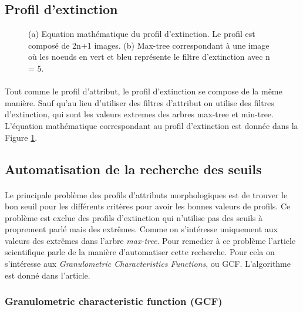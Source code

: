 \documentclass[paper=a4, 11pt]{article}
\begin{document}
\subsection{Profil d'extinction}

\begin{figure}[h]
\centering
{}
\qquad
{}
\caption{(a) Equation mathématique du profil d'extinction. Le profil est composé de 2n+1 images. (b) Max-tree correspondant à une image où les noeuds en vert et bleu représente le filtre d'extinction avec n = 5.}
\label{fig:ep}
\end{figure}


\paragraph{} Tout comme le profil d'attribut, le profil d'extinction se compose de la même manière. Sauf qu'au lieu d'utiliser des filtres d'attribut on utilise des filtres d'extinction, qui sont les valeurs extremes des arbres max-tree et min-tree. L'équation mathématique correspondant au profil d'extinction est donnée dans la Figure \ref{fig:ep}.

\subsection{Automatisation de la recherche des seuils}
\paragraph{} Le principale problème des profils d'attributs morphologiques est de trouver le bon seuil pour les différents critères pour avoir les bonnes valeurs de profils. Ce problème est exclue des profils d'extinction qui n'utilise pas des seuils à proprement parlé mais des extrêmes. Comme on s'intéresse uniquement aux valeurs des extrêmes dans l'arbre \textit{max-tree}. Pour remedier à ce problème l'article scientifique\cite{article2} parle de la manière d'automatiser cette recherche. Pour cela on s'intéresse aux \textit{Granulometric Characteristics Functions}, ou GCF. L'algorithme est donné dans l'article\cite{article2}.

\subsubsection{Granulometric characteristic function (GCF)}
\end{document}
